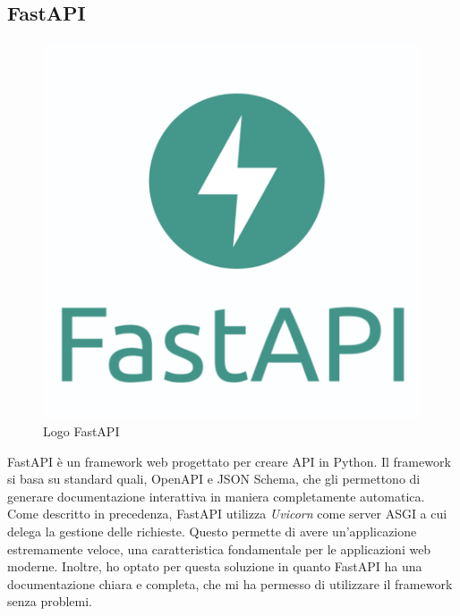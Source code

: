 \subsection{FastAPI}
\begin{figure}
    \centering
    \includegraphics[scale=0.18]{img/fastapi.png}
    \caption{Logo FastAPI}
\end{figure}
    

FastAPI è un framework web progettato per creare API in Python. Il framework si basa su standard quali, OpenAPI e JSON Schema, che gli permettono di generare documentazione interattiva in maniera completamente automatica. Come descritto in precedenza, FastAPI utilizza \textit{Uvicorn} come server ASGI a cui delega la gestione delle richieste. Questo permette di avere un'applicazione estremamente veloce, una caratteristica fondamentale per le applicazioni web moderne. Inoltre, ho optato per questa soluzione in quanto FastAPI ha una documentazione chiara e completa, che mi ha permesso di utilizzare il framework senza problemi. 



